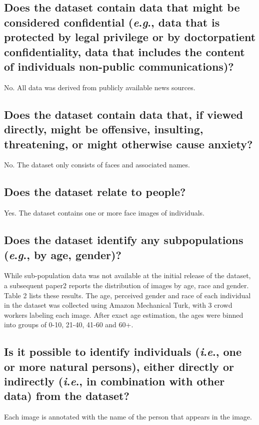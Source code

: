 \documentclass[a4paper,9pt]{extarticle}
\newcommand{\ie}{\textit{i}.\textit{e}., }
\newcommand{\eg}{\textit{e}.\textit{g}., }
\begin{document}
\begin{multicols}{2}
\subsection*{Does the dataset contain data that might be considered confidential (\eg data that is protected by legal privilege or by doctorpatient confidentiality, data that includes the content of individuals non-public communications)?}

\noindent No. All data was derived from publicly available news sources. 

\subsection*{Does the dataset contain data that, if viewed directly, might be offensive, insulting, threatening, or might otherwise cause anxiety?}
No. The dataset only consists of faces and associated names.

\subsection*{Does the dataset relate to people?}
\noindent Yes. The dataset contains one or more face images of individuals.


\subsection*{Does the dataset identify any subpopulations (\eg by age, gender)?}

\noindent While sub-population data was not available at the initial release of the dataset, a subsequent paper2 reports the distribution of images by age, race and gender. Table 2 lists these results. The age, perceived gender and race of each individual in the dataset was collected using Amazon Mechanical Turk, with 3 crowd workers labeling each image. After exact age estimation, the ages were binned into groups of 0-10, 21-40, 41-60 and 60+. 

\subsection*{Is it possible to identify individuals (\ie one or more natural persons), either directly or indirectly (\ie in combination with other data) from the dataset?}
\noindent Each image is annotated with the name of the person that appears
in the image.


\end{multicols}
\end{document}
